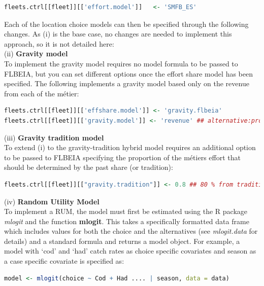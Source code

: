 \documentclass[12pt, halfline, a4paper]{ouparticle}
\begin{document}
\begin{lstlisting}[language=R]
fleets.ctrl[[fleet]][['effort.model']]   <- 'SMFB_ES'
\end{lstlisting} 

Each of the location choice models can then be specified through the following
changes. As (i) is the base case, no changes are needed to implement this
approach, so it is not detailed here: \\

(ii) \textbf{Gravity model} \\

To implement the gravity model requires no model formula to be passed to
FLBEIA, but you can set different options once the effort share model has been
specified. The following implements a gravity model based only on the revenue
from each of the métier:

\begin{lstlisting}[language=R]
fleets.ctrl[[fleet]][['effshare.model']] <- 'gravity.flbeia'
fleets.ctrl[[fleet]][['gravity.model']] <- 'revenue' ## alternative:profit 
\end{lstlisting}

(iii) \textbf{Gravity tradition model} \\

To extend (i) to the gravity-tradition hybrid model requires an additional
option to be passed to FLBEIA specifying the proportion of the métiers effort
that should be determined by the past share (or tradition):

\begin{lstlisting}[language=R]
fleets.ctrl[[fleet]][["gravity.tradition"]] <- 0.8 ## 80 % from tradition
\end{lstlisting}

(iv) \textbf{Random Utility Model} \\

To implement a RUM, the model must first be estimated using the R package
\textit{mlogit} \citep{Croissant2019} and the function \textbf{mlogit}. This
takes a specifically formatted data frame which includes values for both the
choice and the alternatives (see \textit{mlogit.data} for details) and a
standard formula and returns a model object. For example, a model with `cod'
and `had' catch rates as choice specific covariates and season as a case
specific covariate is specified as:

\begin{lstlisting}[language=R]
model <- mlogit(choice ~ Cod + Had .... | season, data = data)
\end{lstlisting}
\end{document}
